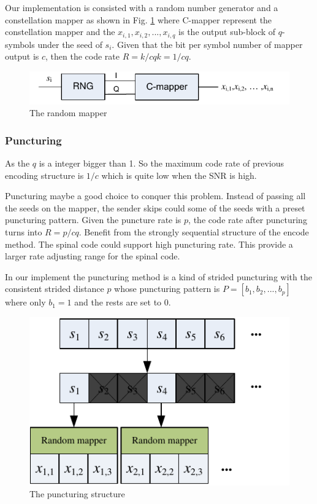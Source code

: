 \documentclass[conference]{IEEEtran}
\begin{document}
Our implementation is consisted with a random number generator and a constellation mapper as shown in Fig. \ref{fig_mapper} where C-mapper represent the constellation mapper and the $x_{i,1},x_{i,2},...,x_{i,q}$ is the output sub-block of $q$-symbols  under the seed of  $s_i$. Given that the bit per symbol number of mapper output is $c$, then the code rate $R=k/cqk=1/cq$.
\begin{figure}[!t]
\centering
\includegraphics[width=3 in]{mapper.pdf}
\caption{The random mapper}
\label{fig_mapper}
\end{figure}
\subsubsection{Puncturing}
As the $q$ is a integer bigger than 1. So the maximum code rate of previous encoding structure is $1/c$ which is quite low when the SNR is high. 

Puncturing maybe a good choice to conquer this problem. Instead of passing all the seeds on the mapper, the sender skips could some of the seeds with a preset puncturing pattern. Given the puncture rate is $p$, the code rate after puncturing turns into $R=p/cq$.
Benefit from the strongly sequential structure of the encode method. The spinal code could support high puncturing rate. This provide a larger rate adjusting range for the spinal code.

In our implement the puncturing method is a kind of strided puncturing with the consistent strided distance $p$ whose puncturing pattern is $P=[b_1,b_2,...,b_p]$ where only $b_1=1$ and the rests are set to 0. 
\begin{figure}[!t]
\centering
\includegraphics[width=3 in]{punturing.pdf}
\caption{The puncturing structure}
\label{fig_puncturing}
\end{figure}
\end{document}
